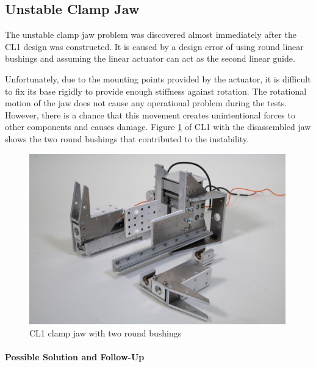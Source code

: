\subsection{Unstable Clamp Jaw}
\label{subsection:exploration-1-unstable-clamp-jaw}

The unstable clamp jaw problem was discovered almost immediately after the CL1 design was constructed. It is caused by a design error of using round linear bushings and assuming the linear actuator can act as the second linear guide.

Unfortunately, due to the mounting points provided by the actuator, it is difficult to fix its base rigidly to provide enough stiffness against rotation. The rotational motion of the jaw does not cause any operational problem during the tests. However, there is a chance that this movement creates unintentional forces to other components and causes damage. Figure \ref{fig:cl1-broken-jaw-photo} of CL1 with the disassembled jaw shows the two round bushings that contributed to the instability.

\begin{figure}
    \centering
    \includegraphics[width=0.99\textwidth]{images/04-4+5/cl1-broken-jaw.jpg}
    \caption{CL1 clamp jaw with two round bushings}
    \label{fig:cl1-broken-jaw-photo}
\end{figure}

\paragraph{Possible Solution and Follow-Up}

